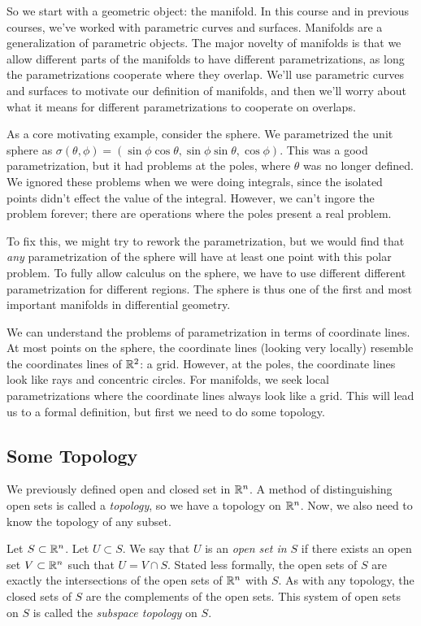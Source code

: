 \documentclass[fleqn,letterpaper]{report}
\begin{document}
So we start with a geometric object: the manifold. In this
course and in previous courses, we've worked with parametric
curves and surfaces. Manifolds are a generalization of
parametric objects. The major novelty of manifolds is that we
allow different parts of the manifolds to have different
parametrizations, as long the parametrizations cooperate where
they overlap. We'll use parametric curves and surfaces to
motivate our definition of manifolds, and then we'll worry
about what it means for different parametrizations to
cooperate on overlaps.

As a core motivating example, consider the sphere. We
parametrized the unit sphere as $\sigma(\theta,\phi) = (\sin \phi
\cos \theta, \sin \phi \sin \theta, \cos \phi)$. This was
a good parametrization, but it had problems at the poles,
where $\theta$ was no longer defined. We ignored these
problems when we were doing integrals, since the isolated
points didn't effect the value of the integral. However, we
can't ingore the problem forever; there are operations 
where the poles present a real problem.

To fix this, we might try to rework the parametrization, but
we would find that \emph{any} parametrization of the sphere
will have at least one point with this polar problem. To fully
allow calculus on the sphere, we have to use different
different parametrization for different regions. The sphere is thus
one of the first and most important manifolds in differential
geometry.

We can understand the problems of parametrization in terms of
coordinate lines. At most points on the sphere, the coordinate
lines (looking very locally) resemble the coordinates lines of
$\mathbb{R}^2$: a grid. However, at the poles, the coordinate lines
look like rays and concentric circles. For manifolds, we seek
local parametrizations where the coordinate lines always
look like a grid. This will lead us to a formal definition,
but first we need to do some topology. 

\subsection{Some Topology}
\label{topology}

We previously defined open and closed set in $\mathbb{R}^n$. A method
of distinguishing open sets is called a \emph{topology}, so
we have a topology on $\mathbb{R}^n$. Now, we also need to know the
topology of any subset.

\begin{defn}
Let $S \subset \mathbb{R}^n$. Let $U \subset S$. We say that $U$ is
an \emph{open set in $S$} if there exists an open set $V
\subset \mathbb{R}^n$ such that $U = V \cap S$. Stated less formally,
the open sets of $S$ are exactly the intersections of the open
sets of $\mathbb{R}^n$ with $S$. As with any topology, the closed
sets of $S$ are the complements of the open sets. This system
of open sets on $S$ is called the \emph{subspace topology} on
$S$. 
\end{defn}
\end{document}
